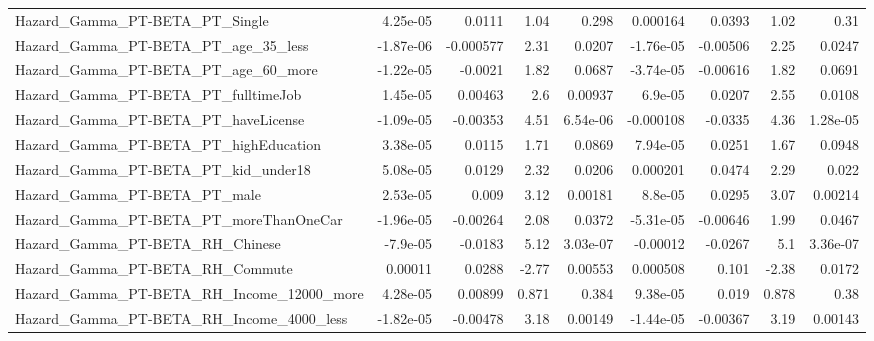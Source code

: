 \begin{tabular}{lrrrrrrrr}
Hazard\_Gamma\_PT-BETA\_PT\_Single                     &    4.25e-05 &       0.0111 &     1.04 &    0.298 &   0.000164 &      0.0393 &         1.02 &          0.31 \\
Hazard\_Gamma\_PT-BETA\_PT\_age\_35\_less                &   -1.87e-06 &    -0.000577 &     2.31 &   0.0207 &  -1.76e-05 &    -0.00506 &         2.25 &        0.0247 \\
Hazard\_Gamma\_PT-BETA\_PT\_age\_60\_more                &   -1.22e-05 &      -0.0021 &     1.82 &   0.0687 &  -3.74e-05 &    -0.00616 &         1.82 &        0.0691 \\
Hazard\_Gamma\_PT-BETA\_PT\_fulltimeJob                &    1.45e-05 &      0.00463 &      2.6 &  0.00937 &    6.9e-05 &      0.0207 &         2.55 &        0.0108 \\
Hazard\_Gamma\_PT-BETA\_PT\_haveLicense                &   -1.09e-05 &     -0.00353 &     4.51 & 6.54e-06 &  -0.000108 &     -0.0335 &         4.36 &      1.28e-05 \\
Hazard\_Gamma\_PT-BETA\_PT\_highEducation              &    3.38e-05 &       0.0115 &     1.71 &   0.0869 &   7.94e-05 &      0.0251 &         1.67 &        0.0948 \\
Hazard\_Gamma\_PT-BETA\_PT\_kid\_under18                &    5.08e-05 &       0.0129 &     2.32 &   0.0206 &   0.000201 &      0.0474 &         2.29 &         0.022 \\
Hazard\_Gamma\_PT-BETA\_PT\_male                       &    2.53e-05 &        0.009 &     3.12 &  0.00181 &    8.8e-05 &      0.0295 &         3.07 &       0.00214 \\
Hazard\_Gamma\_PT-BETA\_PT\_moreThanOneCar             &   -1.96e-05 &     -0.00264 &     2.08 &   0.0372 &  -5.31e-05 &    -0.00646 &         1.99 &        0.0467 \\
Hazard\_Gamma\_PT-BETA\_RH\_Chinese                    &    -7.9e-05 &      -0.0183 &     5.12 & 3.03e-07 &   -0.00012 &     -0.0267 &          5.1 &      3.36e-07 \\
Hazard\_Gamma\_PT-BETA\_RH\_Commute                    &     0.00011 &       0.0288 &    -2.77 &  0.00553 &   0.000508 &       0.101 &        -2.38 &        0.0172 \\
Hazard\_Gamma\_PT-BETA\_RH\_Income\_12000\_more          &    4.28e-05 &      0.00899 &    0.871 &    0.384 &   9.38e-05 &       0.019 &        0.878 &          0.38 \\
Hazard\_Gamma\_PT-BETA\_RH\_Income\_4000\_less           &   -1.82e-05 &     -0.00478 &     3.18 &  0.00149 &  -1.44e-05 &    -0.00367 &         3.19 &       0.00143 \\

\end{tabular}
